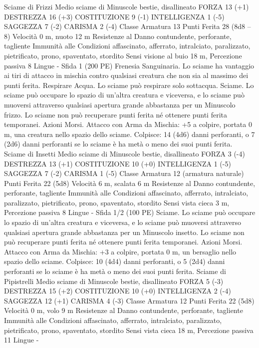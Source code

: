 \begin{multicols}{2}
Sciame di Frizzi
Medio sciame di Minuscole bestie, disallineato
FORZA 13 (+1)
DESTREZZA 16 (+3)
COSTITUZIONE 9 (-1)
INTELLIGENZA 1 (-5)
SAGGEZZA 7 (-2)
CARISMA 2 (-4)
Classe Armatura 13
Punti Ferita 28 (8d8 – 8)
Velocità 0 m, nuoto 12 m
Resistenze al Danno contundente, perforante, tagliente
Immunità alle Condizioni affascinato, afferrato, intralciato,
paralizzato, pietrificato, prono, spaventato, stordito
Sensi visione al buio 18 m, Percezione passiva 8
Lingue -
Sfida 1 (200 PE)
Frenesia Sanguinaria. Lo sciame ha vantaggio ai tiri di attacco
in mischia contro qualsiasi creatura che non sia al massimo dei
punti ferita.
Respirare Acqua. Lo sciame può respirare solo sottacqua.
Sciame. Lo sciame può occupare lo spazio di un’altra creatura e
viceversa, e lo sciame può muoversi attraverso qualsiasi apertura
grande abbastanza per un Minuscolo frizzo. Lo sciame non può
recuperare punti ferita né ottenere punti ferita temporanei.
Azioni
Morsi. Attacco con Arma da Mischia: +5 a colpire, portata 0 m,
una creatura nello spazio dello sciame.
Colpisce: 14 (4d6) danni perforanti, o 7 (2d6) danni perforanti se
lo sciame è ha metà o meno dei suoi punti ferita.
Sciame di Insetti
Medio sciame di Minuscole bestie, disallineato
FORZA 3 (-4)
DESTREZZA 13 (+1)
COSTITUZIONE 10 (+0)
INTELLIGENZA 1 (-5)
SAGGEZZA 7 (-2)
CARISMA 1 (-5)
Classe Armatura 12 (armatura naturale)
Punti Ferita 22 (5d8)
Velocità 6 m, scalata 6 m
Resistenze al Danno contundente, perforante, tagliente
Immunità alle Condizioni affascinato, afferrato, intralciato,
paralizzato, pietrificato, prono, spaventato, stordito
Sensi vista cieca 3 m, Percezione passiva 8
Lingue -
Sfida 1/2 (100 PE)
Sciame. Lo sciame può occupare lo spazio di un’altra creatura e
viceversa, e lo sciame può muoversi attraverso qualsiasi apertura
grande abbastanza per un Minuscolo insetto. Lo sciame non può
recuperare punti ferita né ottenere punti ferita temporanei.
Azioni
Morsi. Attacco con Arma da Mischia: +3 a colpire, portata 0 m,
un bersaglio nello spazio dello sciame.
Colpisce: 10 (4d4) danni perforanti, o 5 (2d4) danni perforanti se
lo sciame è ha metà o meno dei suoi punti ferita.
Sciame di Pipistrelli
Medio sciame di Minuscole bestie, disallineato
FORZA 5 (-3)
DESTREZZA 15 (+2)
COSTITUZIONE 10 (+0)
INTELLIGENZA 2 (-4)
SAGGEZZA 12 (+1)
CARISMA 4 (-3)
Classe Armatura 12
Punti Ferita 22 (5d8)
Velocità 0 m, volo 9 m
Resistenze al Danno contundente, perforante, tagliente
Immunità alle Condizioni affascinato, afferrato, intralciato,
paralizzato, pietrificato, prono, spaventato, stordito
Sensi vista cieca 18 m, Percezione passiva 11
Lingue -

\end{multicols}
